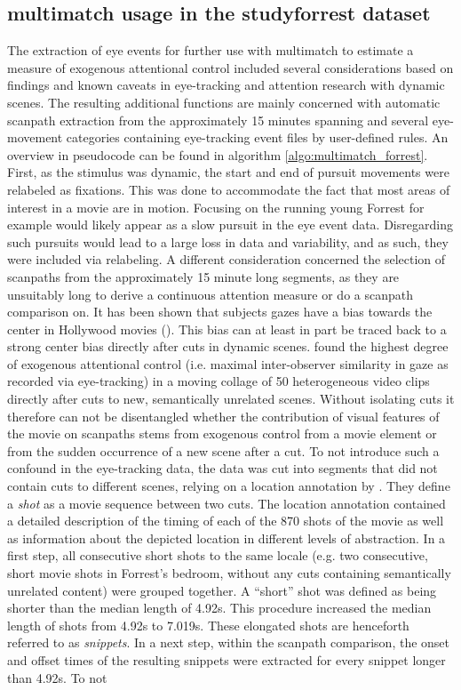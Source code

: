 \documentclass[a4paper, 12pt]{scrreprt}
\begin{document}
\subsection{multimatch usage in the studyforrest dataset}
The extraction of eye events for further use with multimatch to estimate a measure of exogenous attentional control included several considerations based on findings and known caveats in eye-tracking and attention research with dynamic scenes. The resulting additional functions are mainly concerned with automatic scanpath extraction from the approximately 15 minutes spanning and several eye-movement categories containing eye-tracking event files by user-defined rules. An overview in pseudocode can be found in algorithm \ref{algo:multimatch_forrest}. \newline
First, as the stimulus was dynamic, the start and end of pursuit movements were relabeled as fixations. This was done to accommodate the fact that most areas of interest in a movie are in motion. Focusing on the running young Forrest for example would likely appear as a slow pursuit in the eye event data. Disregarding such pursuits would lead to a large loss in data and variability, and as such, they were included via relabeling. \newline A different consideration concerned the selection of scanpaths from the approximately 15 minute long segments, as they are unsuitably long to derive a continuous attention measure or do a scanpath comparison on. It has been shown that subjects gazes have a bias towards the center in Hollywood movies (\cite{tseng2009quantifying}). This bias can at least in part be traced back to a strong center bias directly after cuts in dynamic scenes. \textcite{carmi2006visual} found the highest degree of exogenous attentional control (i.e. maximal inter-observer similarity in gaze as recorded via eye-tracking) in a moving collage of 50 heterogeneous video clips directly after cuts to new, semantically unrelated scenes. Without isolating cuts it therefore can not be disentangled whether the contribution of visual features of the movie on scanpaths stems from exogenous control from a movie element or from the sudden occurrence of a new scene after a cut. To not introduce such a confound in the eye-tracking data, the data was cut into segments that did not contain cuts to different scenes, relying on a location annotation by \textcite{hausler2016annotation}. They define a \textit{shot} as a movie sequence between two cuts. The location annotation contained a detailed description of the timing of each of the 870 shots of the movie as well as information about the depicted location in different levels of abstraction. In a first step, all consecutive short shots to the same locale (e.g. two consecutive, short movie shots in Forrest's bedroom, without any cuts containing semantically unrelated content) were grouped together. A “short” shot was defined as being shorter than the median length of 4.92s. This procedure increased the median length of shots from 4.92s to 7.019s. These elongated shots are henceforth referred to as \textit{snippets}. In a next step, within the scanpath comparison, the onset and offset times of the resulting snippets were extracted for every snippet longer than 4.92s. To not 
\end{document}
